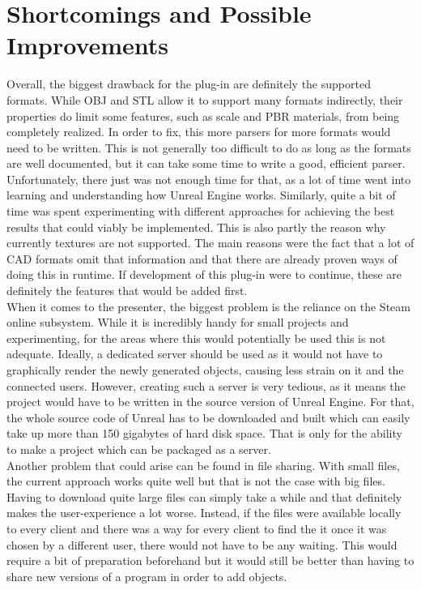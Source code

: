 \section{Shortcomings and Possible Improvements}

Overall, the biggest drawback for the plug-in are definitely the supported formats. While OBJ and STL allow it to support many formats indirectly, their properties do limit some features, such as scale and \acs{PBR} materials, from being completely realized. In order to fix, this more parsers for more formats would need to be written. This is not generally too difficult to do as long as the formats are well documented, but it can take some time to write a good, efficient parser. Unfortunately, there just was not enough time for that, as a lot of time went into learning and understanding how Unreal Engine works. Similarly, quite a bit of time was spent experimenting with different approaches for achieving the best results that could viably be implemented. This is also partly the reason why currently textures are not supported. The main reasons were the fact that a lot of \acs{CAD} formats omit that information and that there are already proven ways of doing this in runtime\cite{bib:RunTex}. If development of this plug-in were to continue, these are definitely the features that would be added first.\\
When it comes to the presenter, the biggest problem is the reliance on the Steam online subsystem. While it is incredibly handy for small projects and experimenting, for the areas where this would potentially be used this is not adequate. Ideally, a dedicated server should be used as it would not have to graphically render the newly generated objects, causing less strain on it and the connected users. However, creating such a server is very tedious, as it means the project would have to be written in the source version of Unreal Engine. For that, the whole source code of Unreal has to be downloaded and built which can easily take up more than 150 gigabytes of hard disk space. That is only for the ability to make a project which can be packaged as a server.\\ 
Another problem that could arise can be found in file sharing. With small files, the current approach works quite well but that is not the case with big files. Having to download quite large files can simply take a while and that definitely makes the user-experience a lot worse. Instead, if the files were available locally to every client and there was a way for every client to find the it once it was chosen by a different user, there would not have to be any waiting. This would require a bit of preparation beforehand but it would still be better than having to share new versions of a program in order to add objects.\\